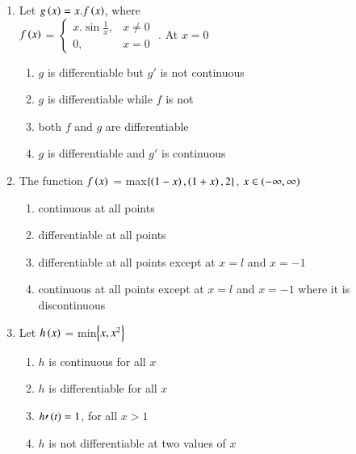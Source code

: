 \documentclass[journal,12pt,twocolumn]{IEEEtran}
\theoremstyle{remark}
\begin{document}
\begin{enumerate}
    \item 
    Let $g\left(x\right)=x.f\left(x\right)$, where\\[6pt] $f\left(x\right)$ = $\begin{cases}
        x.\sin\frac{1}{x}, & x\neq 0\\
        0, & x=0
    \end{cases}$
    . At $x=0$
    
    \hfill 
    {}
    
    \begin{enumerate}[label=(\alph*)]
        
        \item $g$ is differentiable but $g\prime$ is not continuous
        \item $g$ is differentiable while $f$ is not
        \item both $f$ and $g$ are differentiable
        \item $g$ is differentiable and $g\prime$ is continuous 
    \end{enumerate}

    \item 
	    The function $f\left(x\right)$ = max$\left\{\left(1-x\right),\left(1+x\right),2\right\}$, $x\in \left(-\infty,\infty\right)$ 

    \hfill 
    {}
    
    \begin{enumerate}[label=(\alph*)]
        
        \item continuous at all points
        \item differentiable at all points
        \item differentiable at all points except at $x=l$ and $x=-1$
        \item continuous at all points except at $x=l$ and $x=-1$ where it is discontinuous
    \end{enumerate}


    \item 
    Let $h\left(x\right)$ = min$\left\{x,x^{2}\right\}$ 

    \hfill 
    {}

    \begin{enumerate}[label=(\alph*)]
        
        \item $h$ is continuous for all $x$
        \item $h$ is differentiable for all $x$
        \item $h\prime\left(t\right)=1$, for all $x >1$
        \item $h$ is not differentiable at two values of $x$
    \end{enumerate}



\end{enumerate}
\end{document}
